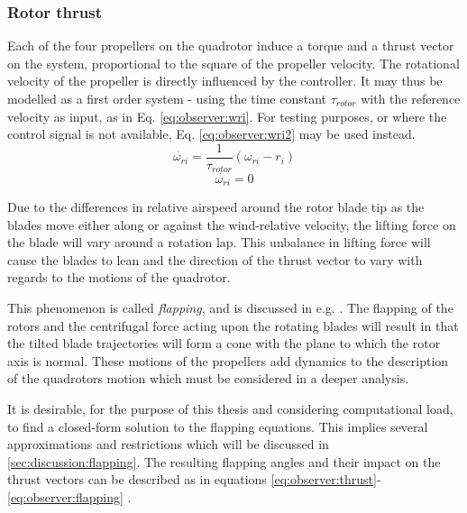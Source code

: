 \subsubsection{Rotor thrust}
\label{ssec:observer:thrust}
    Each of the four propellers on the quadrotor induce a torque
    and a thrust vector on the system, proportional to the square of the
    propeller velocity. The rotational velocity of the propeller is directly
    influenced by the controller. It may thus be modelled as a first order system - using the time constant $\tau_{rotor}$ with
    the reference velocity as input, as in Eq. \eqref{eq:observer:wri}.
    For testing purposes, or where the control signal is not available, Eq. \eqref{eq:observer:wri2} may be used instead.
    \begin{equation}
        \label{eq:observer:wri}
        \dot{\omega_{ri}} = \frac{1}{\tau_{rotor}} \left( \omega_{ri} - r_{i} \right)
    \end{equation}
    \begin{equation}
        \label{eq:observer:wri2}
        \dot{\omega_{ri}} = 0
    \end{equation}

    Due to the differences in relative airspeed around
    the rotor blade tip as the blades move either along or against
    the wind-relative velocity, the lifting force on the blade will vary
    around a rotation lap.
    This unbalance in lifting force will cause the blades to lean and the
    direction of the thrust vector to vary with regards to the motions of the quadrotor.

    This phenomenon is called \textit{flapping}, and is discussed
    in e.g. \citep{Pounds_modellingand}. The flapping of the rotors
    and the centrifugal force acting upon the rotating blades
    will result in that the tilted blade trajectories will
    form a cone with the plane to which the rotor axis is normal.
    These motions of the propellers add dynamics to the
    description of the quadrotors motion which must be considered in a deeper analysis.

    It is desirable, for the purpose of this thesis and
    considering computational load, to find a closed-form
    solution to the flapping equations. This implies several
    approximations and restrictions which will be discussed in
    \ref{sec:discussion:flapping}.
    The resulting flapping angles and their impact on
    the thrust vectors can be described as in equations
    \eqref{eq:observer:thrust}-\eqref{eq:observer:flapping}
    \citep{Pounds_modellingand,prouty1995helicopter,leishman2002principles}.

